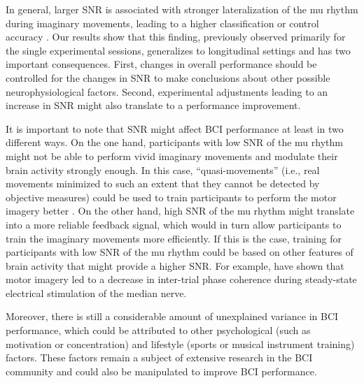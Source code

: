 \medskip

In general, larger SNR is associated with stronger lateralization of the mu rhythm during imaginary movements, leading to a higher classification or control accuracy \citep{Maeder2012}. Our results show that this finding, previously observed primarily for the single experimental sessions, generalizes to longitudinal settings and has two important consequences. First, changes in overall performance should be controlled for the changes in SNR to make conclusions about other possible neurophysiological factors. Second, experimental adjustments leading to an increase in SNR might also translate to a performance improvement. 

\medskip

It is important to note that SNR might affect BCI performance at least in two different ways. On the one hand, participants with low SNR of the mu rhythm might not be able to perform vivid imaginary movements and modulate their brain activity strongly enough. In this case, ``quasi-movements'' (i.e., real movements minimized to such an extent that they cannot be detected by objective measures) could be used to train participants to perform the motor imagery better \citep{Nikulin2008}. On the other hand, high SNR of the mu rhythm might translate into a more reliable feedback signal, which would in turn allow participants to train the imaginary movements more efficiently. If this is the case, training for participants with low SNR of the mu rhythm could be based on other features of brain activity that might provide a higher SNR. For example, \cite{Tao2021} have shown that motor imagery led to a decrease in inter-trial phase coherence during steady-state electrical stimulation of the median nerve. 

\medskip

Moreover, there is still a considerable amount of unexplained variance in BCI performance, which could be attributed to other psychological (such as motivation or concentration) and lifestyle (sports or musical instrument training) factors. These factors remain a subject of extensive research in the BCI community \citep{Hammer2012, Jeunet2015} and could also be manipulated to improve BCI performance.

\medskip

